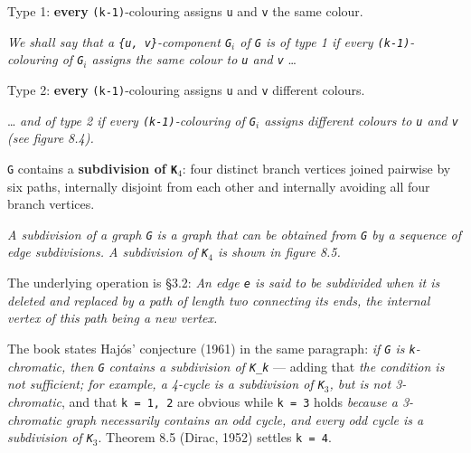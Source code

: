 \begin{definition}
\label{SimpleGraph.Subgraph.IsType1}
\leanok
Type 1: \textbf{every} \texttt{(k-1)}-colouring assigns \texttt{u} and \texttt{v} the
same colour.

\emph{We shall say that a \texttt{\{u, v\}}-component
\texttt{G$_{i}$} of \texttt{G} is of type 1 if every \texttt{(k-1)}-colouring of \texttt{G$_{i}$} assigns the same
colour to \texttt{u} and \texttt{v}} \dots{}
\end{definition}

\begin{definition}
\label{SimpleGraph.Subgraph.IsType2}
\leanok
Type 2: \textbf{every} \texttt{(k-1)}-colouring assigns \texttt{u} and \texttt{v}
different colours.

\dots{} \emph{and of type 2 if every
\texttt{(k-1)}-colouring of \texttt{G$_{i}$} assigns different colours to \texttt{u} and \texttt{v} (see figure
8.4).}
\end{definition}

\begin{definition}
\label{SimpleGraph.HasK4Subdivision}
\leanok
\texttt{G} contains a \textbf{subdivision of \texttt{K$_{4}$}}: four distinct branch vertices joined pairwise by six
paths, internally disjoint from each other and internally avoiding all four branch
vertices.

\emph{A subdivision of a graph \texttt{G} is a graph
that can be obtained from \texttt{G} by a sequence of edge subdivisions. A subdivision
of
\texttt{K$_{4}$} is shown in figure 8.5.}

The underlying operation is \S{}3.2: \emph{An edge \texttt{e} is said to be subdivided
when it is
deleted and replaced by a path of length two connecting its ends, the internal
vertex of this path being a new vertex.}

The book states Haj\'os' conjecture (1961) in the same paragraph: \emph{if \texttt{G} is
\texttt{k}-chromatic, then \texttt{G} contains a subdivision of \texttt{K\_k}} ---
adding that \emph{the condition is not sufficient; for example, a 4-cycle is a
subdivision of \texttt{K$_{3}$}, but is not 3-chromatic}, and that \texttt{k = 1, 2} are
obvious while \texttt{k = 3} holds \emph{because a 3-chromatic graph necessarily
contains an odd cycle, and every odd cycle is a subdivision of \texttt{K$_{3}$}}.
Theorem 8.5 (Dirac, 1952) settles \texttt{k = 4}.
\end{definition}

